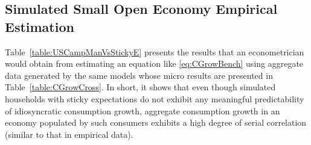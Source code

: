 \documentclass[titlepage]{\econtex}\newcommand{\texname}{cAndCwithStickyE}
\begin{document}

\subsection{Simulated Small Open Economy Empirical Estimation}

Table~\ref{table:USCampManVsStickyE} presents the results that an econometrician would obtain from estimating an equation like \eqref{eq:CGrowBench} using aggregate data generated by the same models whose micro results are presented in Table~\ref{table:CGrowCross}.  In short, it shows that even though simulated households with sticky expectations do not exhibit any meaningful predictability of idiosyncratic consumption growth, aggregate consumption growth in an economy populated by such consumers exhibits a high degree of serial correlation (similar to that in empirical data).
\end{document}

